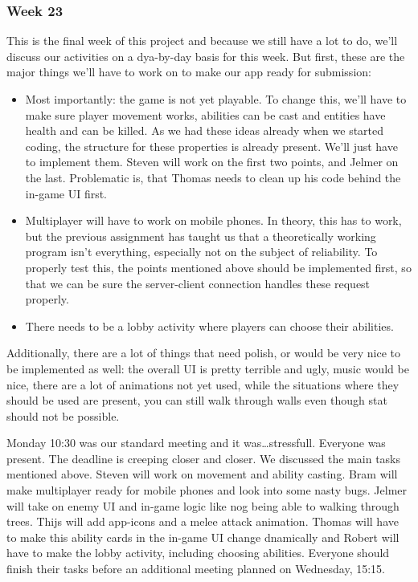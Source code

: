 \documentclass[../main.tex]{subfiles}
\begin{document}
\subsubsection*{Week 23}
This is the final week of this project and because we still have a lot to do, we'll discuss our activities on a dya-by-day basis for this week. But first, these are the major things we'll have to work on to make our app ready for submission:
\begin{itemize}
	\item Most importantly: the game is not yet playable. To change this, we'll have to make sure player movement works, abilities can be cast and entities have health and can be killed. As we had these ideas already when we started coding, the structure for these properties is already present. We'll just have to implement them. Steven will work on the first two points, and Jelmer on the last. Problematic is, that Thomas needs to clean up his code behind the in-game UI first.
	\item Multiplayer will have to work on mobile phones. In theory, this has to work, but the previous assignment has taught us that a theoretically working program isn't everything, especially not on the subject of reliability. To properly test this, the points mentioned above should be implemented first, so that we can be sure the server-client connection handles these request properly.
	\item There needs to be a lobby activity where players can choose their abilities.
\end{itemize}
Additionally, there are a lot of things that need polish, or would be very nice to be implemented as well: the overall UI is pretty terrible and ugly, music would be nice, there are a lot of animations not yet used, while the situations where they should be used are present, you can still walk through walls even though stat should not be possible.

Monday 10:30 was our standard meeting and it was\dots stressfull. Everyone was present. The deadline is creeping closer and closer. We discussed the main tasks mentioned above. Steven will work on movement and ability casting. Bram will make multiplayer ready for mobile phones and look into some nasty bugs. Jelmer will take on enemy UI and in-game logic like nog being able to walking through trees. Thijs will add app-icons and a melee attack animation. Thomas will have to make this ability cards in the in-game UI change dnamically and Robert will have to make the lobby activity, including choosing abilities. Everyone should finish their tasks before an additional meeting planned on Wednesday, 15:15.
\end{document}
